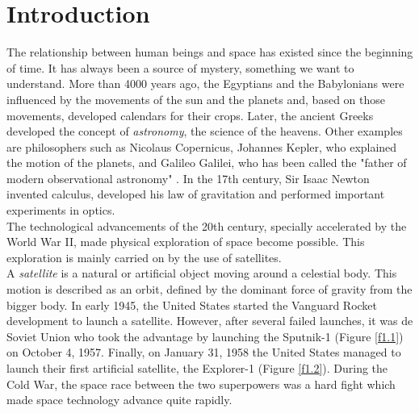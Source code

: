 \cleardoublepage
\setcounter{page}{1}

\chapter{Introduction} 
The relationship between human beings and space has existed since the beginning of time. It has always been a source of mystery, something we want to understand. More than 4000 years ago, the Egyptians and the Babylonians were influenced by the movements of the sun and the planets and, based on those movements, developed calendars for their crops. Later, the ancient Greeks developed the concept of \emph{astronomy}, the science of the heavens. Other examples are philosophers such as Nicolaus Copernicus, Johannes Kepler, who explained the motion of the planets, and Galileo Galilei, who has been called the "father of modern observational astronomy" \cite{Singer}. In the 17th century, Sir Isaac Newton invented calculus, developed his law of gravitation and performed important experiments in optics.\\

The technological advancements of the 20th century, specially accelerated by the World War II, made physical exploration of space become possible. This exploration is mainly carried on by the use of satellites.\\

A \emph{satellite} is a natural or artificial object moving around a celestial body. This motion is described as an orbit, defined by the dominant force of gravity from the bigger body. In early 1945, the United States started the Vanguard Rocket development to launch a satellite. However, after several failed launches, it was de Soviet Union who took the advantage by launching the Sputnik-1 (Figure \ref{f1.1}) on October 4, 1957. Finally, on January 31, 1958 the United States managed to launch their first artificial satellite, the Explorer-1 (Figure \ref{f1.2}). During the Cold War, the space race between the two superpowers was a hard fight which made space technology advance quite rapidly.

